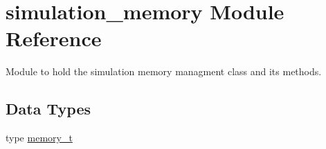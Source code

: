 \hypertarget{namespacesimulation__memory}{}\section{simulation\+\_\+memory Module Reference}
\label{namespacesimulation__memory}


Module to hold the simulation memory managment class and its methods.  


\subsection*{Data Types}
\begin{DoxyCompactItemize}
\item 
type \mbox{\hyperlink{structsimulation__memory_1_1memory__t}{memory\+\_\+t}}
\end{DoxyCompactItemize}
